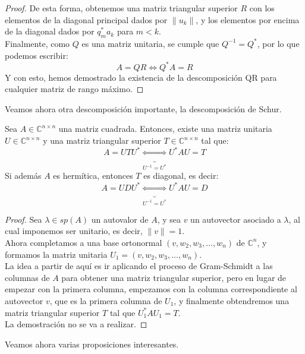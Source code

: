 \begin{proof}
    De esta forma, obtenemos una matriz triangular superior $ R $ con los elementos de la diagonal principal dados por $ \|u_k\| $, y los elementos por encima de la diagonal dados por $ q_m^* a_k $ para $ m < k $.\\
    Finalmente, como $ Q $ es una matriz unitaria, se cumple que $ Q^{-1} = Q^* $, por lo que podemos escribir:
    \[
        A = QR \iff
        Q^* A = R
    \]
    Y con esto, hemos demostrado la existencia de la descomposición QR para cualquier matriz de rango máximo.
\end{proof}

Veamos ahora otra descomposición importante, la descomposición de Schur.

\begin{teorema}
    Sea $ A \in \mathbb{C}^{n \times n} $ una matriz cuadrada. Entonces, existe una matriz unitaria $ U \in \mathbb{C}^{n \times n} $ y una matriz triangular superior $ T \in \mathbb{C}^{n \times n} $ tal que:
    \[
        A = UTU^* \underbrace{\iff}_{U^{-1} = U^*}
        U^* A U = T
    \]
    Si además $ A $ es hermítica, entonces $ T $ es diagonal, es decir:
    \[
        A = UDU^* \underbrace{\iff}_{U^{-1} = U^*}
        U^* A U = D
    \]
\end{teorema}

\begin{proof}
    Sea $\lambda \in sp(A)$ un autovalor de $A$, y sea $v$ un autovector asociado a $\lambda$, al cual imponemos ser unitario, es decir, $\|v\| = 1$.\\
    Ahora completamos a una base ortonormal $(v, w_2, w_3, \dots, w_n)$ de $\mathbb{C}^n$, y formamos la matriz unitaria $U_1 = (v, w_2, w_3, \dots, w_n)$.\\
    La idea a partir de aquí es ir aplicando el proceso de Gram-Schmidt a las columnas de $A$ para obtener una matriz triangular superior, pero en lugar de empezar con la primera columna, empezamos con la columna correspondiente al autovector $v$, que es la primera columna de $U_1$, y finalmente obtendremos una matriz triangular superior $T$ tal que $U_1^* A U_1 = T$.\\
    La demostración no se va a realizar.
\end{proof}

Veamos ahora varias proposiciones interesantes.

